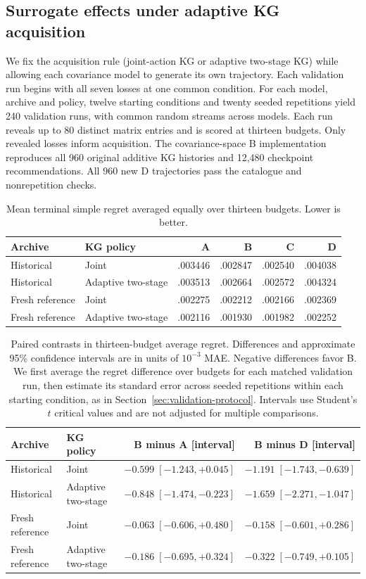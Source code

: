 \subsection{Surrogate effects under adaptive KG acquisition}
\label{app:rq2-e1b}
We fix the acquisition rule (joint-action KG or adaptive two-stage KG) while allowing each covariance model to generate its own trajectory. Each validation run begins with all seven losses at one common condition. For each model, archive and policy, twelve starting conditions and twenty seeded repetitions yield 240 validation runs, with common random streams across models. Each run reveals up to 80 distinct matrix entries and is scored at thirteen budgets. Only revealed losses inform acquisition. The covariance-space B implementation reproduces all 960 original additive KG histories and 12,480 checkpoint recommendations. All 960 new D trajectories pass the catalogue and nonrepetition checks.
\begin{table}[htbp]
\centering\small
\caption{Mean terminal simple regret averaged equally over thirteen budgets. Lower is better.}
\label{tab:rq2-e1b}
\begin{tabular}{llrrrr}
\toprule
Archive & KG policy & A & B & C & D\\
\midrule
Historical & Joint & .003446 & .002847 & .002540 & .004038\\
Historical & Adaptive two-stage & .003513 & .002664 & .002572 & .004324\\
Fresh reference & Joint & .002275 & .002212 & .002166 & .002369\\
Fresh reference & Adaptive two-stage & .002116 & .001930 & .001982 & .002252\\
\bottomrule
\end{tabular}
\end{table}
\begin{table}[htbp]
\centering\small
\caption{Paired contrasts in thirteen-budget average regret. Differences and approximate 95\% confidence intervals are in units of $10^{-3}$ MAE. Negative differences favor B. We first average the regret difference over budgets for each matched validation run, then estimate its standard error across seeded repetitions within each starting condition, as in Section~\ref{sec:validation-protocol}. Intervals use Student's $t$ critical values and are not adjusted for multiple comparisons.}
\label{tab:rq2-contrasts}
\begin{tabular}{llrr}
\toprule
Archive & KG policy & B minus A [interval] & B minus D [interval]\\
\midrule
Historical & Joint & $-0.599\;[-1.243,+0.045]$ & $-1.191\;[-1.743,-0.639]$\\
Historical & Adaptive two-stage & $-0.848\;[-1.474,-0.223]$ & $-1.659\;[-2.271,-1.047]$\\
Fresh reference & Joint & $-0.063\;[-0.606,+0.480]$ & $-0.158\;[-0.601,+0.286]$\\
Fresh reference & Adaptive two-stage & $-0.186\;[-0.695,+0.324]$ & $-0.322\;[-0.749,+0.105]$\\
\bottomrule
\end{tabular}
\end{table}

